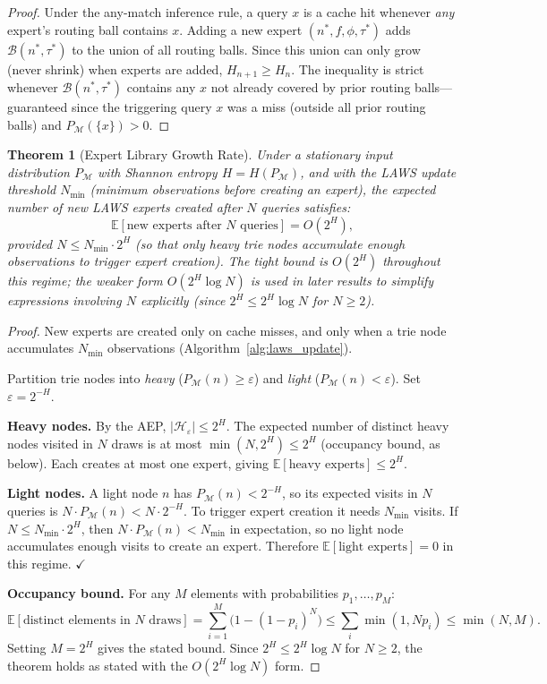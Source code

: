 \documentclass[11pt]{article}
\newtheorem{theorem}{Theorem}
\begin{document}
\begin{proof}
Under the any-match inference rule, a query $x$ is a cache hit
whenever \emph{any} expert's routing ball contains $x$.  Adding a new expert
$(n^*, f, \phi, \tau^*)$ adds $\mathcal{B}(n^*, \tau^*)$ to the union of
all routing balls.  Since this union can only grow (never shrink) when experts
are added, $H_{n+1} \geq H_n$.  The inequality is strict whenever
$\mathcal{B}(n^*, \tau^*)$ contains any $x$ not already covered by prior
routing balls---guaranteed since the triggering query $x$ was a miss
(outside all prior routing balls) and $P_{\mathcal{M}}(\{x\}) > 0$.
\end{proof}

\begin{theorem}[Expert Library Growth Rate]
\label{thm:growth}
Under a stationary input distribution $P_{\mathcal{M}}$ with Shannon entropy
$H = H(P_{\mathcal{M}})$, and with the LAWS update threshold $N_{\min}$
(minimum observations before creating an expert), the expected number of new
LAWS experts created after $N$ queries satisfies:
\[
  \mathbb{E}[\text{new experts after } N \text{ queries}]
  = O\!\left(2^H\right),
\]
provided $N \leq N_{\min} \cdot 2^H$ (so that only \emph{heavy} trie nodes
accumulate enough observations to trigger expert creation).
The tight bound is $O(2^H)$ throughout this regime;
the weaker form $O(2^H \log N)$ is used in later results to simplify expressions
involving $N$ explicitly (since $2^H \leq 2^H \log N$ for $N \geq 2$).
\end{theorem}

\begin{proof}
New experts are created only on cache misses, and only when a trie node
accumulates $N_{\min}$ observations (Algorithm~\ref{alg:laws_update}).

Partition trie nodes into \emph{heavy} ($P_{\mathcal{M}}(n) \geq \varepsilon$) and
\emph{light} ($P_{\mathcal{M}}(n) < \varepsilon$).  Set $\varepsilon = 2^{-H}$.

\textbf{Heavy nodes.}  By the AEP, $|\mathcal{H}_\varepsilon| \leq 2^H$.
The expected number of distinct heavy nodes visited in $N$ draws is at most
$\min(N, 2^H) \leq 2^H$ (occupancy bound, as below).  Each creates at most one
expert, giving $\mathbb{E}[\text{heavy experts}] \leq 2^H$.

\textbf{Light nodes.}  A light node $n$ has $P_{\mathcal{M}}(n) < 2^{-H}$, so
its expected visits in $N$ queries is $N \cdot P_{\mathcal{M}}(n) < N \cdot 2^{-H}$.
To trigger expert creation it needs $N_{\min}$ visits.  If $N \leq N_{\min} \cdot 2^H$,
then $N \cdot P_{\mathcal{M}}(n) < N_{\min}$ in expectation, so no light node
accumulates enough visits to create an expert.  Therefore
$\mathbb{E}[\text{light experts}] = 0$ in this regime. $\checkmark$

\textbf{Occupancy bound.}  For any $M$ elements with probabilities $p_1,\ldots,p_M$:
\[
  \mathbb{E}[\text{distinct elements in }N\text{ draws}]
  = \sum_{i=1}^M \bigl(1-(1-p_i)^N\bigr)
  \leq \sum_i \min(1, Np_i)
  \leq \min(N, M).
\]
Setting $M = 2^H$ gives the stated bound.  Since $2^H \leq 2^H \log N$ for $N \geq 2$,
the theorem holds as stated with the $O(2^H \log N)$ form.
\end{proof}
\end{document}
